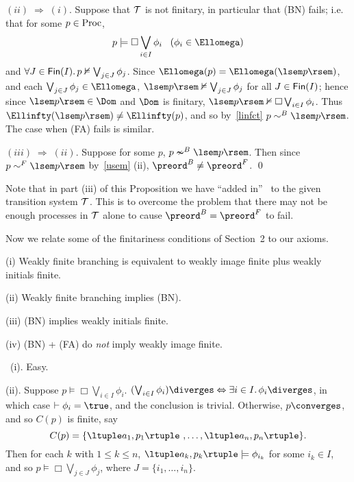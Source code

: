 \noindent $(ii) \; \Longrightarrow \; (i)$. Suppose that ${\cal T}$ is not finitary, in particular that (BN) fails; i.e. that for some $p \in {\rm Proc}$,
\[ p \models \Box \bigvee_{i \in I} \phi_{i} \;\;\; ( \phi_{i} \in \Ellomega ) \]
and $\forall J \in {\sf Fin}(I). \, p \nvDash \bigvee_{j \in J} \phi_{j}$.
Since $\Ellomega (p) = \Ellomega ( \lsem p \rsem )$, and each $\bigvee_{j \in J} \phi_{j} \in \Ellomega$, 
$\lsem p \rsem \nvDash \bigvee_{j \in J} \phi_{j}$ for all $J \in {\sf Fin}(I)$;
hence since $\lsem p \rsem \in \Dom$ and $\Dom$ is finitary, $\lsem p \rsem \nvDash \Box \bigvee_{i \in I} \phi_{i}$.
Thus $\Ellinfty (\lsem p \rsem ) \not= \Ellinfty (p)$, and so by~\ref{linfct} $p \sim^{B} \lsem p \rsem$.
The case when (FA) fails is similar. 

\noindent $(iii) \; \Longrightarrow \; (ii)$. Suppose for some $p$, $p \nsim^{B} \lsem p \rsem$.
Then since $p \sim^{F} \lsem p \rsem$ by~\ref{usem} (ii), ${\preord^{B}} \not= {\preord^{F}}$. \qed

Note that in part (iii) of this Proposition we have ``added in'' \Dom\ to the given transition system ${\cal T}$.
This is to overcome the problem that there may not be enough processes in ${\cal T}$ alone to cause $\preord^{B} = \preord^{F}$ to fail.

Now we relate some of the finitariness conditions of Section~2 to our axioms.

\begin{proposition}
\label{finots}
(i) Weakly finite branching is equivalent to weakly image finite plus weakly initials finite.

\noindent (ii) Weakly finite branching implies (BN).

\noindent (iii) (BN) implies weakly initials finite.

\noindent (iv) (BN) + (FA) do {\em not} imply weakly image finite.
\end{proposition}

\proof\ (i). Easy.

\noindent (ii). Suppose $p \models \Box \bigvee_{i \in I} \phi_{i}$.
$(\bigvee_{i \in I} \phi_{i}) \diverges  \Leftrightarrow  \exists i \in I. \, \phi_{i} \diverges$, in which case $\vdash \phi_{i} = \true$, and the conclusion is trivial.
Otherwise, $p \converges$, and so $C(p)$ is finite, say 
\[ C(p) = \{ \ltuple a_{1}, p_{1} \rtuple\ , \ldots , \ltuple a_{n}, p_{n} \rtuple \} . \]
Then for each $k$ with $1 \leq k \leq n$, $\ltuple a_{k}, p_{k} \rtuple \models \phi_{i_{k}}$ for some $i_{k} \in I$, and so $p \models \Box \bigvee_{j \in J} \phi_{j}$, where $J = \{ i_{1}, \ldots , i_{n} \}$.

